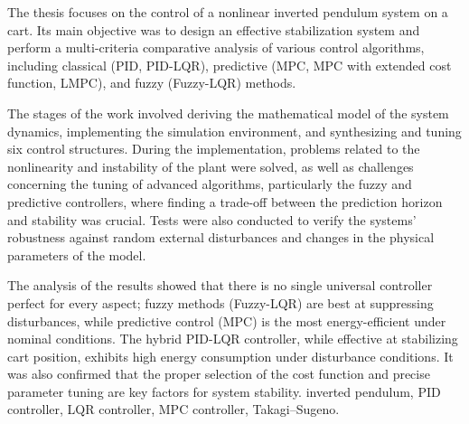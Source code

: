 \documentclass[
    left=2.5cm,         %
    right=2.5cm,        %
    top=2.5cm,          %
    bottom=3cm,         %
    bindingoffset=6mm,  %
    nohyphenation=false %
]{eiti/eiti-thesis}
\begin{document}
\newpage
\abstract

The thesis focuses on the control of a nonlinear inverted pendulum system on a cart. Its main objective was to design an effective stabilization system and perform a multi-criteria comparative analysis of various control algorithms, including classical (PID, PID-LQR), predictive (MPC, MPC with extended cost function, LMPC), and fuzzy (Fuzzy-LQR) methods.

The stages of the work involved deriving the mathematical model of the system dynamics, implementing the simulation environment, and synthesizing and tuning six control structures. During the implementation, problems related to the nonlinearity and instability of the plant were solved, as well as challenges concerning the tuning of advanced algorithms, particularly the fuzzy and predictive controllers, where finding a trade-off between the prediction horizon and stability was crucial. Tests were also conducted to verify the systems' robustness against random external disturbances and changes in the physical parameters of the model.

The analysis of the results showed that there is no single universal controller perfect for every aspect; fuzzy methods (Fuzzy-LQR) are best at suppressing disturbances, while predictive control (MPC) is the most energy-efficient under nominal conditions. The hybrid PID-LQR controller, while effective at stabilizing cart position, exhibits high energy consumption under disturbance conditions. It was also confirmed that the proper selection of the cost function and precise parameter tuning are key factors for system stability. 
\keywords inverted pendulum, PID controller, LQR controller, MPC controller, Takagi\allowbreak--\allowbreak Sugeno.
\cleardoublepage  %

\cleardoublepage %
\tableofcontents

\cleardoublepage %
\pagestyle{headings}

\end{document}
